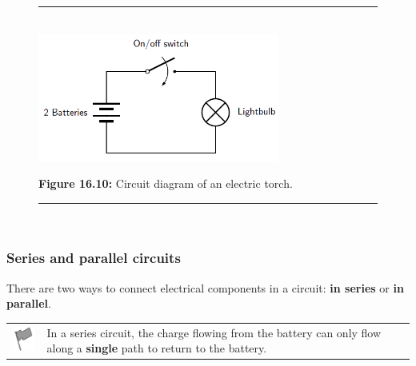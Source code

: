     \setcounter{subfigure}{0}


	\begin{figure}[H] %
    \begin{center}
    \rule[.1in]{\figurerulewidth}{.005in} \\
        \label{m38771*uid15!!!underscore!!!media}\label{m38771*uid15!!!underscore!!!printimage}\includegraphics[width=300px]{col11305.imgs/m38516_PG10C9_010.png} %
        
      \vspace{2pt}
    \vspace{\rubberspace}\par \begin{cnxcaption}
	  \small \textbf{Figure 16.10: }Circuit diagram of an electric torch.
	\end{cnxcaption}
      
    \vspace{.1in}
    \rule[.1in]{\figurerulewidth}{.005in} \\
        
    \end{center}

 \end{figure}   

    \addtocounter{footnote}{-0}
    
        
        \label{m38771*uid16}
            \subsubsection{ Series and parallel circuits}
            \nopagebreak
            
          
          \label{m38771*id63292}There are two ways to connect electrical components in a circuit: \textbf{in series} or \textbf{in parallel}.\par 
\label{m38771*fhsst!!!underscore!!!id283}\begin{definition}
	  \begin{tabular*}{15 cm}{m{15 mm}m{}}
	\hspace*{-50pt}  \includegraphics[width=0.5in]{col11305.imgs/psflag2.png}   & \Definition{   \label{id2478736}\textbf{ Series circuit }} { \label{m38771*meaningfhsst!!!underscore!!!id283}
          \label{m38771*id63313}In a series circuit, the charge flowing from the battery can only flow along a \textbf{single} path to return to the battery. \par 
           } 
      \end{tabular*}
      \end{definition}

